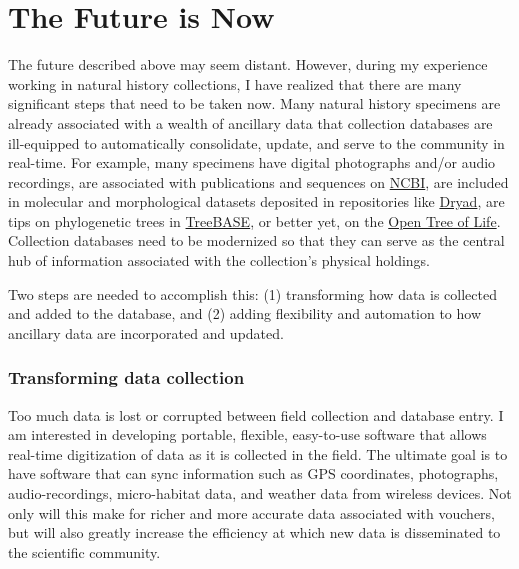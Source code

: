 \documentclass[10pt]{article}
\begin{document}
\section*{The Future is Now}
The future described above may seem distant.
However, during my experience working in natural history collections, I have
realized that there are many significant steps that need to be taken now.
Many natural history specimens are already associated with a wealth of ancillary
data that collection databases are ill-equipped to automatically consolidate,
update, and serve to the community in real-time.
For example, many specimens 
have digital photographs and/or audio recordings,
are associated with publications and sequences on
\href{http://www.ncbi.nlm.nih.gov}{NCBI}, are included in molecular and
morphological datasets deposited in repositories like
\href{http://datadryad.org}{Dryad}, are tips on phylogenetic trees in
\href{http://treebase.org}{TreeBASE}, or better yet, on the
\href{http://opentreeoflife.org}{Open Tree of Life}.
Collection databases need to be modernized so that they can serve
as the central hub of information associated with the collection's
physical holdings.

Two steps are needed to accomplish this: (1) transforming how data is
collected and added to the database, and (2) adding flexibility and automation
to how ancillary data are incorporated and updated.

\subsubsection*{Transforming data collection}
Too much data is lost or corrupted between field collection and database entry.
I am interested in developing portable, flexible, easy-to-use software
that allows real-time digitization of data as it is collected in the field.
The ultimate goal is to have software that can sync information such as
GPS coordinates, photographs, audio-recordings, micro-habitat data, and
weather data from wireless devices.
Not only will this make for richer and more accurate data associated with
vouchers, but will also greatly increase the efficiency at which new
data is disseminated to the scientific community.
\end{document}

